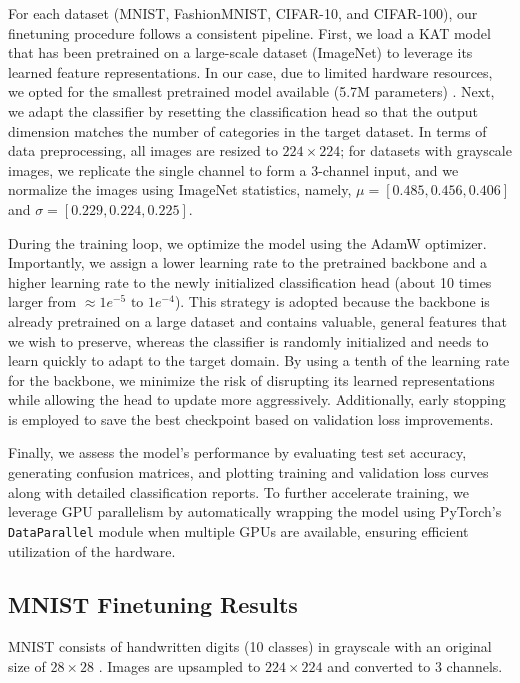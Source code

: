\documentclass[conference]{IEEEtran}
\begin{document}
For each dataset (MNIST, FashionMNIST, CIFAR-10, and CIFAR-100), our finetuning
procedure follows a consistent pipeline. First, we load a KAT model that has
been pretrained on a large-scale dataset (ImageNet) to leverage
its learned feature representations. In our case, due to limited hardware
resources, we opted for the smallest pretrained model available (5.7M
parameters) \cite{kat}. Next, we adapt the classifier by resetting the
classification head so that the output dimension matches the number of
categories in the target dataset. In terms of data preprocessing, all images
are resized to $224\times224$; for datasets with grayscale images, we replicate
the single channel to form a 3-channel input, and we normalize the images using
ImageNet statistics, namely, \(\mu=[0.485, 0.456, 0.406]\) and \(\sigma=[0.229,
0.224, 0.225]\).

During the training loop, we optimize the model using the AdamW optimizer.
Importantly, we assign a lower learning rate to the pretrained backbone and a
higher learning rate to the newly initialized classification head (about 10 times larger from $\approx 1e^{-5} \text{ to } 1e^{-4}$). This
strategy is adopted because the backbone is already pretrained on a large
dataset and contains valuable, general features that we wish to preserve,
whereas the classifier is randomly initialized and needs to learn quickly to
adapt to the target domain. By using a tenth of the learning rate for the
backbone, we minimize the risk of disrupting its learned representations while
allowing the head to update more aggressively. Additionally, early stopping is
employed to save the best checkpoint based on validation loss improvements.

Finally, we assess the model's performance by evaluating test set accuracy,
generating confusion matrices, and plotting training and validation loss curves
along with detailed classification reports. To further accelerate training, we
leverage GPU parallelism by automatically wrapping the model using PyTorch's
\texttt{DataParallel} module when multiple GPUs are available, ensuring
efficient utilization of the hardware.

\subsection{MNIST Finetuning Results}
MNIST consists of handwritten digits (10 classes) in grayscale with an original
size of $28\times28$ \cite{mnist}. Images are upsampled to $224\times224$ and
converted to 3 channels.
\end{document}

